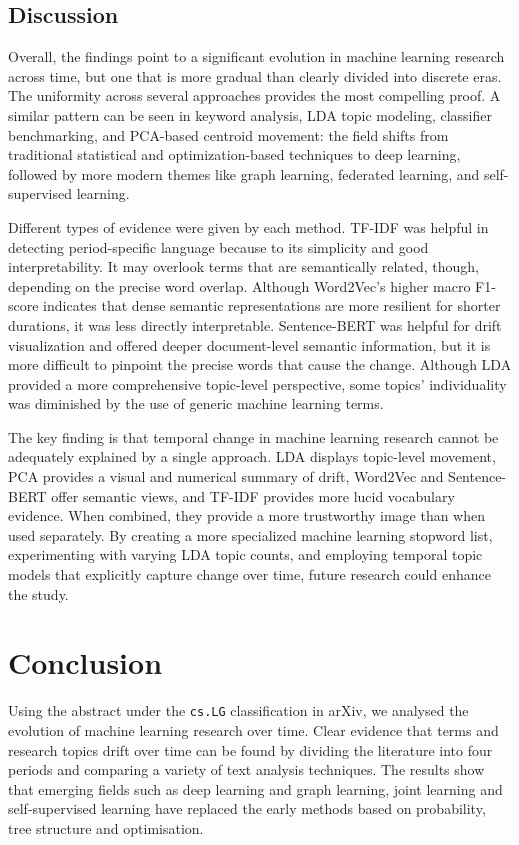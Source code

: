\documentclass[11pt]{article}
\begin{document}
\subsection{Discussion}

Overall, the findings point to a significant evolution in machine learning research across time, but one that is more gradual than clearly divided into discrete eras. The uniformity across several approaches provides the most compelling proof. A similar pattern can be seen in keyword analysis, LDA topic modeling, classifier benchmarking, and PCA-based centroid movement: the field shifts from traditional statistical and optimization-based techniques to deep learning, followed by more modern themes like graph learning, federated learning, and self-supervised learning.

Different types of evidence were given by each method. TF-IDF was helpful in detecting period-specific language because to its simplicity and good interpretability. It may overlook terms that are semantically related, though, depending on the precise word overlap. Although Word2Vec's higher macro F1-score indicates that dense semantic representations are more resilient for shorter durations, it was less directly interpretable. Sentence-BERT was helpful for drift visualization and offered deeper document-level semantic information, but it is more difficult to pinpoint the precise words that cause the change. Although LDA provided a more comprehensive topic-level perspective, some topics' individuality was diminished by the use of generic machine learning terms.

The key finding is that temporal change in machine learning research cannot be adequately explained by a single approach. LDA displays topic-level movement, PCA provides a visual and numerical summary of drift, Word2Vec and Sentence-BERT offer semantic views, and TF-IDF provides more lucid vocabulary evidence. When combined, they provide a more trustworthy image than when used separately. By creating a more specialized machine learning stopword list, experimenting with varying LDA topic counts, and employing temporal topic models that explicitly capture change over time, future research could enhance the study.


\section{Conclusion}

Using the abstract under the \texttt{cs.LG} classification in arXiv, we analysed the evolution of machine learning research over time. Clear evidence that terms and research topics drift over time can be found by dividing the literature into four periods and comparing a variety of text analysis techniques. The results show that emerging fields such as deep learning and graph learning, joint learning and self-supervised learning have replaced the early methods based on probability, tree structure and optimisation.
\end{document}
